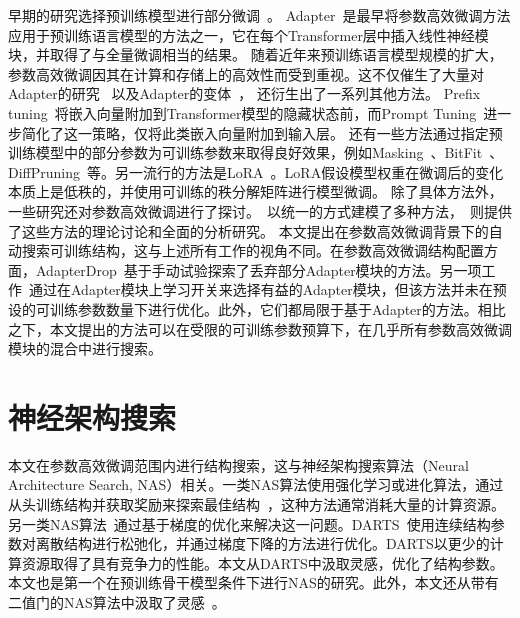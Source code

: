 早期的研究选择预训练模型进行部分微调~\cite{tajbakhsh2016convolutional, guo2020adafilter, guo2019spottune}。  
Adapter~\cite{houlsby2019parameter}是最早将参数高效微调方法应用于预训练语言模型的方法之一，它在每个Transformer层中插入线性神经模块，并取得了与全量微调相当的结果。  
随着近年来预训练语言模型规模的扩大，参数高效微调因其在计算和存储上的高效性而受到重视。这不仅催生了大量对Adapter的研究~\cite{pfeiffer2020adapterfusion,he2021effectiveness}
以及Adapter的变体~\cite{mahabadi2021compacter,sung2021vl}，
还衍生出了一系列其他方法。  
Prefix tuning~\cite{li2021prefix}将嵌入向量附加到Transformer模型的隐藏状态前，而Prompt Tuning~\cite{lester2021power}进一步简化了这一策略，仅将此类嵌入向量附加到输入层。  
还有一些方法通过指定预训练模型中的部分参数为可训练参数来取得良好效果，例如Masking~\cite{zhao2020masking}、BitFit~\cite{zaken2021bitfit}、DiffPruning~\cite{guo2021parameter}等。另一流行的方法是LoRA~\cite{hu2021lora}。LoRA假设模型权重在微调后的变化本质上是低秩的，并使用可训练的秩分解矩阵进行模型微调。  
除了具体方法外，一些研究还对参数高效微调进行了探讨。~\citet{he2022unified}以统一的方式建模了多种方法，~\citet{ding2022delta}则提供了这些方法的理论讨论和全面的分析研究。  
本文提出在参数高效微调背景下的自动搜索可训练结构，这与上述所有工作的视角不同。在参数高效微调结构配置方面，AdapterDrop~\cite{ruckle-etal-2021-adapterdrop}基于手动试验探索了丢弃部分Adapter模块的方法。另一项工作~\cite{moosavi2022adaptable}通过在Adapter模块上学习开关来选择有益的Adapter模块，但该方法并未在预设的可训练参数数量下进行优化。此外，它们都局限于基于Adapter的方法。相比之下，本文提出的方法可以在受限的可训练参数预算下，在几乎所有参数高效微调模块的混合中进行搜索。  


\section{神经架构搜索} 

本文在参数高效微调范围内进行结构搜索，这与神经架构搜索算法（Neural Architecture Search, NAS）相关。一类NAS算法使用强化学习或进化算法，通过从头训练结构并获取奖励来探索最佳结构~\cite{zoph2016neural, zoph2018learning,real2019regularized,pham2018efficient}，这种方法通常消耗大量的计算资源。另一类NAS算法~\cite{liu2018darts, liang2019darts+, chen2019progressive}通过基于梯度的优化来解决这一问题。DARTS~\cite{liu2018darts}使用连续结构参数对离散结构进行松弛化，并通过梯度下降的方法进行优化。DARTS以更少的计算资源取得了具有竞争力的性能。本文从DARTS中汲取灵感，优化了结构参数。本文也是第一个在预训练骨干模型条件下进行NAS的研究。此外，本文还从带有二值门的NAS算法中汲取了灵感~\cite{cai2018proxylessnas, wu2019fbnet}。


